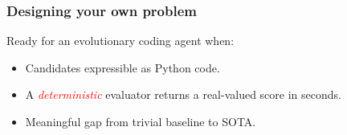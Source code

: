 \documentclass{beamer}
\theoremstyle{definition}
\newcommand\remph[1]{\emph{\textcolor{red}{#1}}}
\newcommand\bemph[1]{\emph{\textcolor{blue}{#1}}}
\begin{document}

\begin{frame}
  \frametitle{Designing your own problem}
  Ready for an evolutionary coding agent when:
  \pause
  \vspace{.3cm}

  \begin{itemize}
    \item[\textbf{1.}] Candidates expressible as Python code.
      \pause
      \vspace{.2cm}
    \item[\textbf{2.}] A \remph{deterministic} evaluator returns a
      real-valued score in seconds.
      \pause
      \vspace{.2cm}
    \item[\textbf{3.}] Meaningful gap from trivial baseline to SOTA.
  \end{itemize}

\end{frame}



\end{document}
